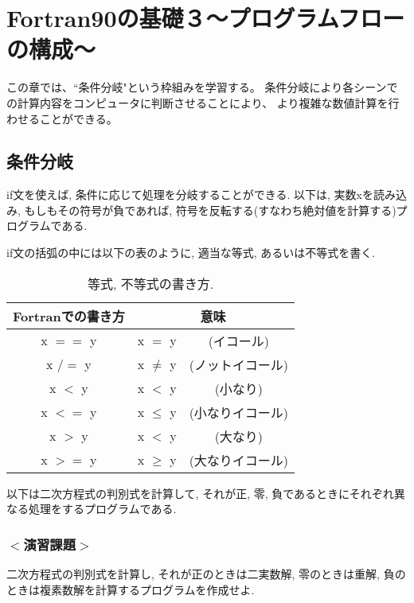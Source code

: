 \chapter{Fortran90の基礎３〜プログラムフローの構成〜}
この章では、``条件分岐"という枠組みを学習する。
条件分岐により各シーンでの計算内容をコンピュータに判断させることにより、
より複雑な数値計算を行わせることができる。

\section{条件分岐}
{\ttfamily if}文を使えば, 条件に応じて処理を分岐することができる.
以下は, 実数xを読み込み, もしもその符号が負であれば,
符号を反転する(すなわち絶対値を計算する)プログラムである.

{\ttfamily if}文の括弧の中には以下の表のように, 適当な等式, あるいは不等式を書く.

\begin{table}[h]
  \caption{等式, 不等式の書き方. }
  \begin{center}
    \begin{tabular}{ccc}
      \hline
      Fortranでの書き方   & \multicolumn{2}{c}{意味} \\ \hline
      x $==$ y   & x $=$ y &(イコール)\\
      x $/=$ y   & x $\ne$ y &(ノットイコール)\\
      x $<$ y   & x $<$ y &(小なり)\\
      x $<=$ y  & x $\le$ y &(小なりイコール)\\
      x $>$ y  & x $<$ y &(大なり)\\
      x $>=$ y   & x $\ge$ y &(大なりイコール)\\ \hline
    \end{tabular}
  \end{center}
\end{table}


以下は二次方程式の判別式を計算して, それが正, 零, 負であるときにそれぞれ異なる処理をするプログラムである.


\subsection*{$<$演習課題$>$}
二次方程式の判別式を計算し, それが正のときは二実数解,
零のときは重解, 負のときは複素数解を計算するプログラムを作成せよ.

